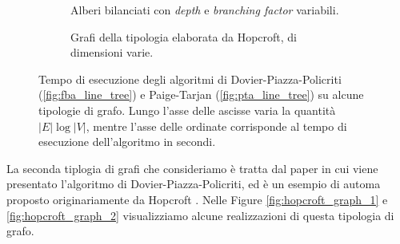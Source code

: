 \begin{figure}
    \begin{subfigure}[t]{0.5\textwidth}
        \caption{Alberi bilanciati con \emph{depth} e \emph{branching factor} variabili.}
        \label{fig:tree_exp_result}
    \end{subfigure}
    \begin{subfigure}[t]{0.5\textwidth}
        \caption{Grafi della tipologia elaborata da Hopcroft, di dimensioni varie.}
        \label{fig:hopcroft_exp_result}
    \end{subfigure}
    \caption{Tempo di esecuzione degli algoritmi di Dovier-Piazza-Policriti (\ref*{fig:fba_line_tree}) e Paige-Tarjan (\ref*{fig:pta_line_tree}) su alcune tipologie di grafo. Lungo l'asse delle ascisse varia la quantità $|E|\log|V|$, mentre l'asse delle ordinate corrisponde al tempo di esecuzione dell'algoritmo in secondi.}
\end{figure}

La seconda tiplogia di grafi che consideriamo è tratta dal paper in cui viene presentato l'algoritmo di Dovier-Piazza-Policriti, ed è un esempio di automa proposto originariamente da Hopcroft \cite{hopcroft}. Nelle Figure \ref{fig:hopcroft_graph_1} e \ref{fig:hopcroft_graph_2} visualizziamo alcune realizzazioni di questa tipologia di grafo.

